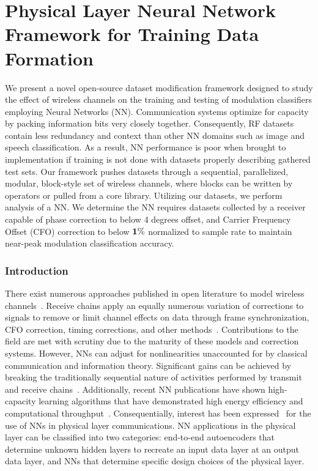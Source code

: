 \chapter{Physical Layer Neural Network Framework for Training Data Formation}
\label{chapter3}

We present a novel open-source dataset modification framework designed to study the effect of wireless channels on the training and testing of modulation classifiers employing Neural Networks (NN). Communication systems optimize for capacity by packing information bits very closely together. Consequently, RF datasets contain less redundancy and context than other NN domains such as image and speech classification. As a result, NN performance is poor when brought to implementation if training is not done with datasets properly describing gathered test sets. Our framework pushes datasets through a sequential, parallelized, modular, block-style set of wireless channels, where blocks can be written by operators or pulled from a core library. Utilizing our datasets, we perform analysis of a NN. We determine the NN requires datasets collected by a receiver capable of phase correction to below 4 degrees offset, and Carrier Frequency Offset (CFO) correction to below $\bf{1\%}$ normalized to sample rate to maintain near-peak modulation classification accuracy.

\subsection{Introduction}
\label{sec1}

There exist numerous approaches published in open literature to model wireless channels~\cite{tsb88tia}. Receive chains apply an equally numerous variation of corrections to signals to remove or limit channel effects on data through frame synchronization, CFO correction, timing corrections, and other methods~\cite{rappaport1996wireless}. Contributions to the field are met with scrutiny due to the maturity of these models and correction systems. However, NNs can adjust for nonlinearities unaccounted for by classical communication and information theory\cite{schenk2008rf}. Significant gains can be achieved by breaking the traditionally sequential nature of activities performed by transmit and receive chains~\cite{wymeersch2007iterative}. Additionally, recent NN publications have shown high-capacity learning algorithms that have demonstrated high energy efficiency and computational throughput~\cite{raina2009large}. Consequentially, interest has been expressed~\cite{8054694, wang2017deep} for the use of NNs in physical layer communications. NN applications in the physical layer can be classified into two categories: end-to-end autoencoders that determine unknown hidden layers to recreate an input data layer at an output data layer, and NNs that determine specific design choices of the physical layer.

